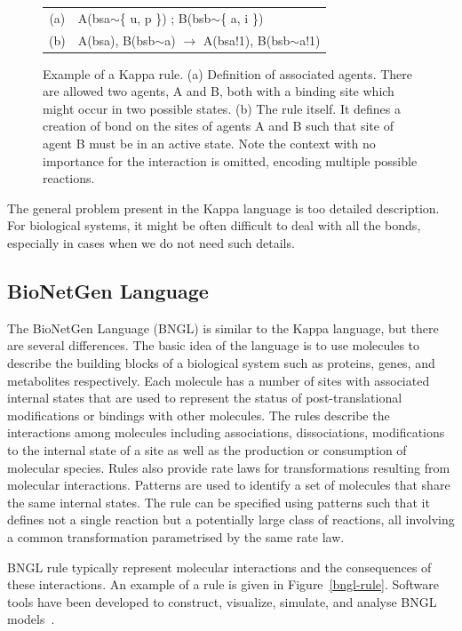 \documentclass[11pt,a4paper]{report}
\begin{document}
\begin{figure}[!h]
\begin{center}
\begin{tabular}{c l}
(a) & A(bsa$\sim$\{ u, p \}) ; B(bsb$\sim$\{ a, i \}) \\
(b) & A(bsa), B(bsb$\sim$a) $\rightarrow$ A(bsa!1), B(bsb$\sim$a!1) \\
\end{tabular}
\end{center}
\caption{Example of a Kappa rule. (a) Definition of associated agents. There are allowed two agents, A and B, both with a binding site which might occur in two possible states. (b) The rule itself. It defines a creation of bond on the sites of agents A and B such that site of agent B must be in an active state. Note the context with no importance for the interaction is omitted, encoding multiple possible reactions.}\label{kappa-rule}
\end{figure}

The general problem present in the Kappa language is too detailed description. For biological systems, it might be often difficult to deal with all the bonds, especially in cases when we do not need such details.

\subsection{BioNetGen Language}
\label{bngl}

The BioNetGen Language (BNGL) \cite{BNGL} is similar to the Kappa language, but there are several differences. The basic idea of the language is to use molecules to describe the building blocks of a biological system such as proteins, genes, and metabolites respectively. Each molecule has a number of sites with associated internal states that are used to represent the status of post-translational modifications or bindings with other molecules. The rules describe the interactions among molecules including associa­tions, dissociations, modifications to the internal state of a site
as well as the production or consumption of molecular species. Rules also provide rate laws for transformations resulting from molecular interactions. Patterns are used to identify a set of molecules that share the same internal states. The rule can be specified using patterns such that it defines not a single reaction but a potentially large class of reactions, all involving a common transformation parametrised by the  same rate law.

BNGL rule typically represent molecular interactions and the consequences of these interactions. An example of a rule is given in Figure~\ref{bngl-rule}. Software tools have been developed to construct, visualize, simulate, and analyse BNGL models~\cite{wenskovitch2014mosbie,harris2016bionetgen,xu2011rulebender,sneddon2011efficient}.
\end{document}
